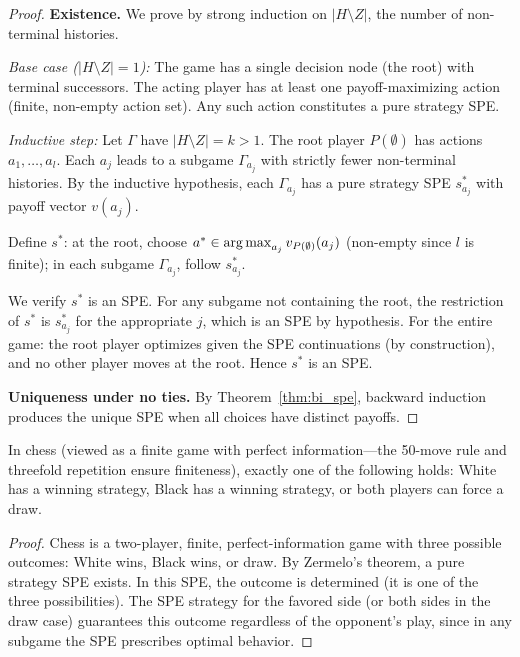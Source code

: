 \documentclass[11pt,a4paper]{article}
\begin{document}
\begin{proof}
\textbf{Existence.} We prove by strong induction on $|H \setminus Z|$, the
number of non-terminal histories.

\emph{Base case ($|H \setminus Z| = 1$):} The game has a single decision
node (the root) with terminal successors. The acting player has at least
one payoff-maximizing action (finite, non-empty action set). Any such action
constitutes a pure strategy SPE.

\emph{Inductive step:} Let $\Gamma$ have $|H \setminus Z| = k > 1$. The
root player $P(\emptyset)$ has actions $a_1, \ldots, a_l$. Each $a_j$ leads
to a subgame $\Gamma_{a_j}$ with strictly fewer non-terminal histories. By
the inductive hypothesis, each $\Gamma_{a_j}$ has a pure strategy SPE
$s^*_{a_j}$ with payoff vector $v(a_j)$.

Define $s^*$: at the root, choose
$a^* \in \operatorname{arg\,max}_{a_j} v_{P(\emptyset)}(a_j)$ (non-empty since $l$ is
finite); in each subgame $\Gamma_{a_j}$, follow $s^*_{a_j}$.

We verify $s^*$ is an SPE. For any subgame not containing the root, the
restriction of $s^*$ is $s^*_{a_j}$ for the appropriate $j$, which is an SPE
by hypothesis. For the entire game: the root player optimizes given the SPE
continuations (by construction), and no other player moves at the root. Hence
$s^*$ is an SPE.

\textbf{Uniqueness under no ties.} By Theorem~\ref{thm:bi_spe}, backward
induction produces the unique SPE when all choices have distinct payoffs.
\end{proof}

\begin{corollary}
\label{cor:chess}
In chess (viewed as a finite game with perfect information---the 50-move
rule and threefold repetition ensure finiteness), exactly one of the
following holds: White has a winning strategy, Black has a winning strategy,
or both players can force a draw.
\end{corollary}

\begin{proof}
Chess is a two-player, finite, perfect-information game with three possible
outcomes: White wins, Black wins, or draw. By Zermelo's theorem, a pure
strategy SPE exists. In this SPE, the outcome is determined (it is one of
the three possibilities). The SPE strategy for the favored side (or both
sides in the draw case) guarantees this outcome regardless of the opponent's
play, since in any subgame the SPE prescribes optimal behavior.
\end{proof}
\end{document}
